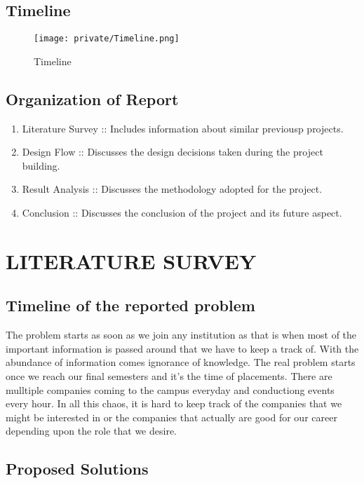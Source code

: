 \documentclass[14pt]{extarticle}
\begin{document}
\subsection{Timeline}

\begin{figure}[!htb]
    \begin{center}
        \texttt{[image: private/Timeline.png]}
    \end{center}
    \caption{Timeline}
\end{figure}

\subsection{Organization of Report}

\begin{enumerate}
    \item Literature Survey :: Includes information about similar previousp projects.
    \item Design Flow :: Discusses the design decisions taken during the project building.
    \item Result Analysis :: Discusses the methodology adopted for the project.
    \item Conclusion :: Discusses the conclusion of the project and its future aspect.
\end{enumerate}


\newpage
\section{LITERATURE SURVEY}

\subsection{Timeline of the reported problem}

The problem starts as soon as we join any institution as that is when most of the important information is passed around that we have to keep a track of. With the abundance of information comes ignorance of knowledge. The real problem starts once we reach our final semesters and it's the time of placements. There are mulltiple companies coming to the campus everyday and conductiong events every hour. In all this chaos, it is hard to keep track of the companies that we might be interested in or the companies that actually are good for our career depending upon the role that we desire.

\subsection{Proposed Solutions}
\end{document}
